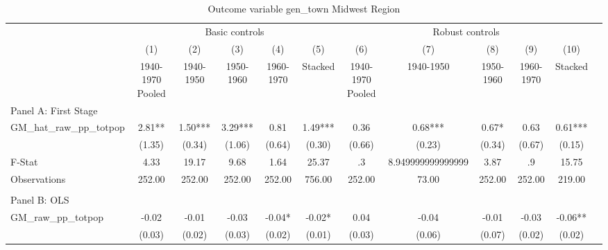  \begin{table}[htbp]\centering {} \begin{threeparttable} \caption{Outcome variable gen\_town Midwest Region} \begin{tabular}{l*{11}{c}} \toprule
          &\multicolumn{5}{c}{Basic controls}                                   &\multicolumn{5}{c}{Robust controls}                                  \\\cmidrule(lr){2-6}\cmidrule(lr){7-11}
          &\multicolumn{1}{c}{(1)}&\multicolumn{1}{c}{(2)}&\multicolumn{1}{c}{(3)}&\multicolumn{1}{c}{(4)}&\multicolumn{1}{c}{(5)}&\multicolumn{1}{c}{(6)}&\multicolumn{1}{c}{(7)}&\multicolumn{1}{c}{(8)}&\multicolumn{1}{c}{(9)}&\multicolumn{1}{c}{(10)}\\
          &\multicolumn{1}{c}{1940-1970 Pooled}&\multicolumn{1}{c}{1940-1950}&\multicolumn{1}{c}{1950-1960}&\multicolumn{1}{c}{1960-1970}&\multicolumn{1}{c}{Stacked}&\multicolumn{1}{c}{1940-1970 Pooled}&\multicolumn{1}{c}{1940-1950}&\multicolumn{1}{c}{1950-1960}&\multicolumn{1}{c}{1960-1970}&\multicolumn{1}{c}{Stacked}\\
\cmidrule(lr){1-11}
\multicolumn{10}{l}{Panel A: First Stage}\\
\cmidrule(lr){1-11}
GM\_hat\_raw\_pp\_totpop&      2.81** &      1.50***&      3.29***&      0.81   &      1.49***&      0.36   &      0.68***&      0.67*  &      0.63   &      0.61***\\
          &    (1.35)   &    (0.34)   &    (1.06)   &    (0.64)   &    (0.30)   &    (0.66)   &    (0.23)   &    (0.34)   &    (0.67)   &    (0.15)   \\
\midrule
F-Stat    &      4.33   &     19.17   &      9.68   &      1.64   &     25.37   &        .3   &8.949999999999999   &      3.87   &        .9   &     15.75   \\
Observations&    252.00   &    252.00   &    252.00   &    252.00   &    756.00   &    252.00   &     73.00   &    252.00   &    252.00   &    219.00   \\
\cmidrule[\heavyrulewidth](lr){1-11} \\ \cmidrule[\heavyrulewidth](lr){1-11}
\multicolumn{10}{l}{Panel B: OLS}\\
\cmidrule(lr){1-11}
GM\_raw\_pp\_totpop&     -0.02   &     -0.01   &     -0.03   &     -0.04*  &     -0.02*  &      0.04   &     -0.04   &     -0.01   &     -0.03   &     -0.06** \\
          &    (0.03)   &    (0.02)   &    (0.03)   &    (0.02)   &    (0.01)   &    (0.03)   &    (0.06)   &    (0.07)   &    (0.02)   &    (0.02)   \\

\end{tabular}
\end{threeparttable}
\end{table}
